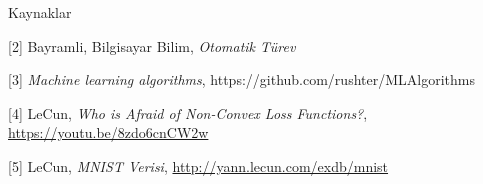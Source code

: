 \documentclass[12pt,fleqn]{article}\usepackage{../../common}
\begin{document}
Kaynaklar

[2] Bayramli, Bilgisayar Bilim, {\em Otomatik Türev}

[3] {\em Machine learning algorithms}, https://github.com/rushter/MLAlgorithms

[4] LeCun, {\em Who is Afraid of Non-Convex Loss Functions?}, \url{https://youtu.be/8zdo6cnCW2w}

[5] LeCun, {\em MNIST Verisi}, \url{http://yann.lecun.com/exdb/mnist}
\end{document}
